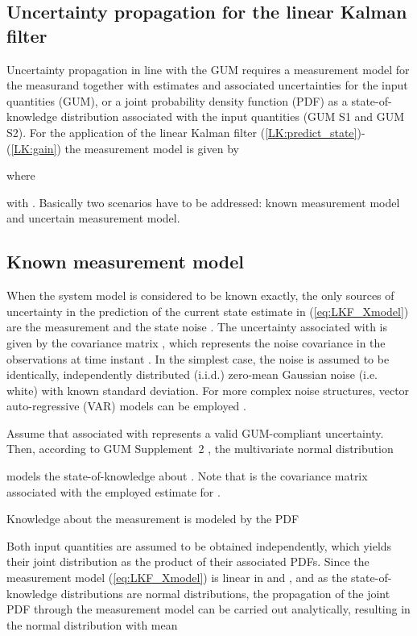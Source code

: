 \documentclass[10pt]{article}
\begin{document}
\begin{spacing}{1}
\section{Uncertainty propagation for the linear Kalman filter}
\label{sec:LKF}
Uncertainty propagation in line with the GUM requires a measurement model for the measurand together with estimates and associated uncertainties for the input quantities (GUM), or a joint probability density function (PDF) as a state-of-knowledge distribution associated with the input quantities (GUM S1 and GUM S2). For the application of the linear Kalman filter (\ref{LK:predict_state})-(\ref{LK:gain}) the measurement model is given by

where

with . Basically two scenarios have to be addressed: known measurement model and uncertain measurement model. 




\subsection{Known measurement model}
\label{sec:LKF_knownmodel}
When the system model is considered to be known exactly, the only sources of uncertainty 
in the prediction of the current state estimate in (\ref{eq:LKF_Xmodel}) are the measurement  and the state noise . The uncertainty associated with  is given by the covariance matrix , which represents the noise covariance in the observations at time instant . In the simplest case, the noise is assumed to be identically, independently distributed (i.i.d.) zero-mean Gaussian noise (i.e. white) with known standard deviation. For more complex noise structures, vector auto-regressive (VAR) models can be employed \cite{Reinsel:1992ki}. 

Assume that  associated with  represents a valid GUM-compliant uncertainty. Then, according to GUM Supplement~2 \cite{GUMS2}, the multivariate normal distribution 

models the state-of-knowledge about . 
Note that  is the covariance matrix associated with the employed estimate  for .

Knowledge about the measurement  is modeled by the PDF

Both input quantities are assumed to be obtained independently, which yields their joint distribution as the product of their associated PDFs. Since the measurement model (\ref{eq:LKF_Xmodel}) is linear in  and , and as the state-of-knowledge distributions are normal distributions, the propagation of the joint PDF through the measurement model can be carried out analytically, resulting in the normal distribution with mean


\end{spacing}
\end{document}

